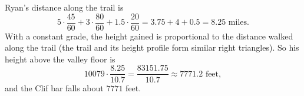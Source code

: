 Ryan's distance along the trail is
\[5\cdot\dfrac{45}{60}+3\cdot\dfrac{80}{60}+1.5\cdot\dfrac{20}{60}=3.75+4+0.5=8.25\text{ miles}.\]
With a constant grade, the height gained is proportional to the distance walked along the trail (the trail and its height profile form similar right triangles). So his height above the valley floor is
\[10079\cdot\dfrac{8.25}{10.7}=\dfrac{83151.75}{10.7}\approx7771.2\text{ feet},\]
and the Clif bar falls about $\boxed{7771}$ feet.
